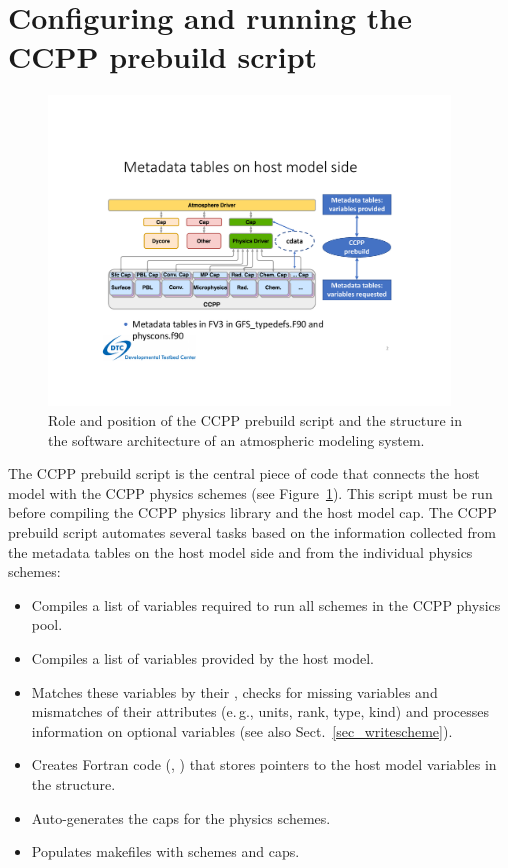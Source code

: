 \section{Configuring and running the CCPP prebuild script}
\label{sec_ccpp_prebuild_config}
\begin{figure}
\centerline{\includegraphics[width=0.95\textwidth]{./images/ccpp_design_with_ccpp_prebuild.pdf}}
\caption{Role and position of the CCPP prebuild script and the  structure in the software architecture of an atmospheric modeling system.}\label{fig_ccpp_design_with_ccpp_prebuild}
\end{figure}
The CCPP prebuild script  is the central piece of code that connects the host model with the CCPP physics schemes (see Figure~\ref{fig_ccpp_design_with_ccpp_prebuild}). This script must be run before compiling the CCPP physics library and the host model cap. The CCPP prebuild script automates several tasks based on the information collected from the metadata tables on the host model side and from the individual physics schemes:
\begin{itemize}
\item Compiles a list of variables required to run all schemes in the CCPP physics pool.
\item Compiles a list of variables provided by the host model.
\item Matches these variables by their , checks for missing variables and mismatches of their attributes (e.\,g., units, rank, type, kind) and processes information on optional variables (see also Sect.~\ref{sec_writescheme}).
\item Creates Fortran code (, ) that stores pointers to the host model variables in the  structure.
\item Auto-generates the caps for the physics schemes.
\item Populates makefiles with schemes and caps.
\end{itemize}

